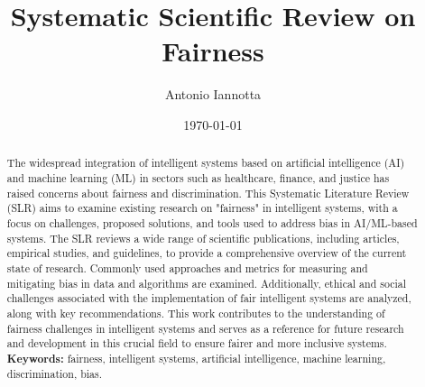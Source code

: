 \documentclass{article}
\title{Systematic Scientific Review on Fairness}
\author{Antonio Iannotta}
\date{\today}
\begin{document}
\maketitle

\begin{abstract}
    The widespread integration of intelligent systems based on artificial intelligence (AI) and machine learning (ML) in sectors such as healthcare, finance, and justice has raised concerns about fairness and discrimination. This Systematic Literature Review (SLR) aims to examine existing research on "fairness" in intelligent systems, with a focus on challenges, proposed solutions, and tools used to address bias in AI/ML-based systems.
    The SLR reviews a wide range of scientific publications, including articles, empirical studies, and guidelines, to provide a comprehensive overview of the current state of research. Commonly used approaches and metrics for measuring and mitigating bias in data and algorithms are examined. Additionally, ethical and social challenges associated with the implementation of fair intelligent systems are analyzed, along with key recommendations.
    This work contributes to the understanding of fairness challenges in intelligent systems and serves as a reference for future research and development in this crucial field to ensure fairer and more inclusive systems. \\
    \textbf{Keywords:} fairness, intelligent systems, artificial intelligence, machine learning, discrimination, bias.
\end{abstract}
\end{document}
